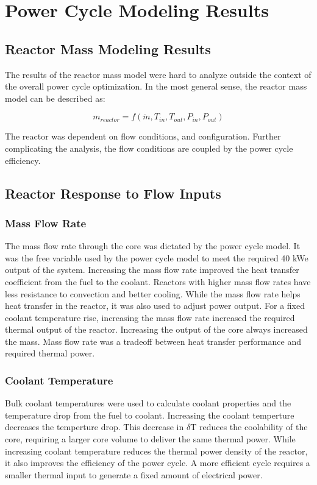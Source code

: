 \chapter{Power Cycle Modeling Results}\label{ch:power_cycle_results}

\section{Reactor Mass Modeling Results}
The results of the reactor mass model were hard to analyze outside the context of
the overall power cycle optimization. In the most general sense, the reactor
mass model can be described as:

\begin{equation}
    m_{reactor} = f(\dot{m}, T_{in}, T_{out}, P_{in}, P_{out})
\end{equation}

The reactor was dependent on flow conditions, and configuration. Further
complicating the analysis, the flow conditions are coupled by the power cycle
efficiency.

\section{Reactor Response to Flow Inputs}

\subsection{Mass Flow Rate}
The mass flow rate through the core was dictated by the power cycle model. It was
the free variable used by the power cycle model to meet the required 40 kWe
output of the system. Increasing the mass flow rate improved the heat transfer
coefficient from the fuel to the coolant. Reactors with higher mass flow rates
have less resistance to convection and better cooling. While the mass flow rate
helps heat transfer in the reactor, it was also used to adjust power output. For
a fixed coolant temperature rise, increasing the mass flow rate increased the
required thermal output of the reactor. Increasing the output of the core always
increased the mass. Mass flow rate was a tradeoff between heat transfer
performance and required thermal power.

\subsection{Coolant Temperature}
Bulk coolant temperatures were used to calculate coolant properties and the
temperature drop from the fuel to coolant. Increasing the coolant temperture
decreases the temperture drop. This decrease in $\delta$T reduces the
coolability of the core, requiring a larger core volume to deliver the same
thermal power. While increasing coolant temperature reduces the thermal power
density of the reactor, it also improves the efficiency of the power cycle. A
more efficient cycle requires a smaller thermal input to generate a fixed amount
of electrical power.

